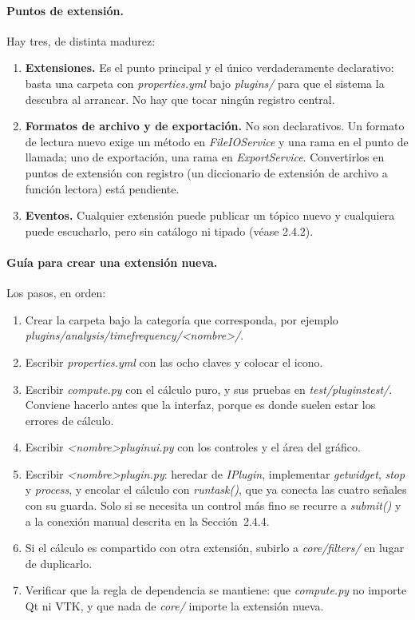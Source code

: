 \documentclass[12pt,letterpaper,oneside]{article}
\DeclareRobustCommand{\_}{\textunderscore\allowbreak}
\begin{document}
\paragraph{Puntos de extensión.} Hay tres, de distinta madurez:

\begin{enumerate}
    \item \textbf{Extensiones.} Es el punto principal y el único verdaderamente declarativo: basta una carpeta con \textit{properties.yml} bajo \textit{plugins/} para que el sistema la descubra al arrancar. No hay que tocar ningún registro central.
    \item \textbf{Formatos de archivo y de exportación.} No son declarativos. Un formato de lectura nuevo exige un método en \textit{FileIOService} y una rama en el punto de llamada; uno de exportación, una rama en \textit{ExportService}. Convertirlos en puntos de extensión con registro (un diccionario de extensión de archivo a función lectora) está pendiente.
    \item \textbf{Eventos.} Cualquier extensión puede publicar un tópico nuevo y cualquiera puede escucharlo, pero sin catálogo ni tipado (véase 2.4.2).
\end{enumerate}

\paragraph{Guía para crear una extensión nueva.} Los pasos, en orden:

\begin{enumerate}
    \item Crear la carpeta bajo la categoría que corresponda, por ejemplo \textit{plugins/\allowbreak analysis/\allowbreak time\_frequency/\allowbreak <nombre>/}.
    \item Escribir \textit{properties.yml} con las ocho claves y colocar el icono.
    \item Escribir \textit{compute.py} con el cálculo puro, y sus pruebas en \textit{test/plugins\_test/}. Conviene hacerlo antes que la interfaz, porque es donde suelen estar los errores de cálculo.
    \item Escribir \textit{<nombre>\_plugin\_ui.py} con los controles y el área del gráfico.
    \item Escribir \textit{<nombre>\_plugin.py}: heredar de \textit{IPlugin}, implementar \textit{get\_widget}, \textit{stop} y \textit{process}, y encolar el cálculo con \textit{run\_task()}, que ya conecta las cuatro señales con su guarda. Solo si se necesita un control más fino se recurre a \textit{submit()} y a la conexión manual descrita en la Sección~2.4.4.
    \item Si el cálculo es compartido con otra extensión, subirlo a \textit{core/filters/} en lugar de duplicarlo.
    \item Verificar que la regla de dependencia se mantiene: que \textit{compute.py} no importe Qt ni VTK, y que nada de \textit{core/} importe la extensión nueva.
\end{enumerate}
\end{document}
